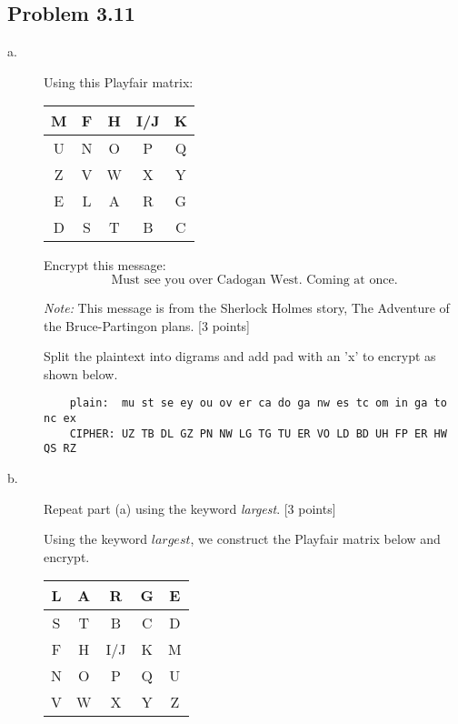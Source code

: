 \documentclass[../hw_sols.tex]{subfiles}
\begin{document}
\newpage



\subsection*{Problem 3.11}
\begin{description}

\item[a.] Using this Playfair matrix:
\begin{center}
	\begin{tabular}{ | c | c | c | c | c | }
		\hline
		M & F & H & I/J & K \\
		\hline
		U & N & O &   P & Q \\
		\hline
		Z & V & W &   X & Y \\
		\hline
		E & L & A &   R & G \\
		\hline
		D & S & T &   B & C \\
		\hline
	\end{tabular}
\end{center}
Encrypt this message:
	$$\text{Must see you over Cadogan West. Coming at once.}$$

\noindent \textit{Note:} This message is from the Sherlock Holmes story, The Adventure of the Bruce-Partingon plans. [3 points]

\begin{solution}
Split the plaintext into digrams and add pad with an 'x' to encrypt as shown below.
	\begin{verbatim}
    plain:  mu st se ey ou ov er ca do ga nw es tc om in ga to nc ex
    CIPHER: UZ TB DL GZ PN NW LG TG TU ER VO LD BD UH FP ER HW QS RZ
	\end{verbatim}
\end{solution}


\item[b.] Repeat part (a) using the keyword \textit{largest}. [3 points]

\begin{solution}
Using the keyword $largest$, we construct the Playfair matrix below and encrypt.
\begin{center}
	\begin{tabular}{ | c | c | c | c | c | }
		\hline \rowcolor{cyan!40}
		L & A & R & G & E \\
		\hline
		S \cellcolor{cyan!40} & T \cellcolor{cyan!40} & B & C & D\\
		\hline
		F & H & I/J & K & M\\
		\hline
		N & O &   P & Q & U\\
		\hline
		V & W &   X & Y & Z\\
		\hline
	\end{tabular}
\end{center}


\end{solution}
\end{description}
\end{document}
